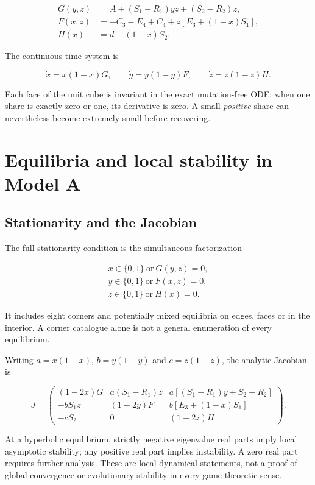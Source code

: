 \documentclass[
  11pt,
  letterpaper,
]{article}
\begin{document}
\[
\begin{aligned}
G(y,z)&=A+(S_1-R_1)yz+(S_2-R_2)z,\\
F(x,z)&=-C_3-E_4+C_4+z[E_3+(1-x)S_1],\\
H(x)&=d+(1-x)S_2.
\end{aligned}
\]

The continuous-time system is

\[\dot x=x(1-x)G,\qquad \dot y=y(1-y)F,\qquad \dot z=z(1-z)H.\]

Each face of the unit cube is invariant in the exact mutation-free ODE:
when one share is exactly zero or one, its derivative is zero. A small
\emph{positive} share can nevertheless become extremely small before
recovering.

\section{Equilibria and local stability in Model
A}\label{equilibria-and-local-stability-in-model-a}

\subsection{Stationarity and the
Jacobian}\label{stationarity-and-the-jacobian}

The full stationarity condition is the simultaneous factorization

\[
\begin{gathered}
x\in\{0,1\}\ \text{or}\ G(y,z)=0,\\
y\in\{0,1\}\ \text{or}\ F(x,z)=0,\\
z\in\{0,1\}\ \text{or}\ H(x)=0.
\end{gathered}
\]

It includes eight corners and potentially mixed equilibria on edges,
faces or in the interior. A corner catalogue alone is not a general
enumeration of every equilibrium.

Writing \(a=x(1-x)\), \(b=y(1-y)\) and \(c=z(1-z)\), the analytic
Jacobian is

\[
J=\begin{pmatrix}
(1-2x)G & a(S_1-R_1)z & a[(S_1-R_1)y+S_2-R_2]\\
-bS_1z & (1-2y)F & b[E_3+(1-x)S_1]\\
-cS_2 & 0 & (1-2z)H
\end{pmatrix}.
\]

At a hyperbolic equilibrium, strictly negative eigenvalue real parts
imply local asymptotic stability; any positive real part implies
instability. A zero real part requires further analysis. These are local
dynamical statements, not a proof of global convergence or evolutionary
stability in every game-theoretic sense.
\end{document}
